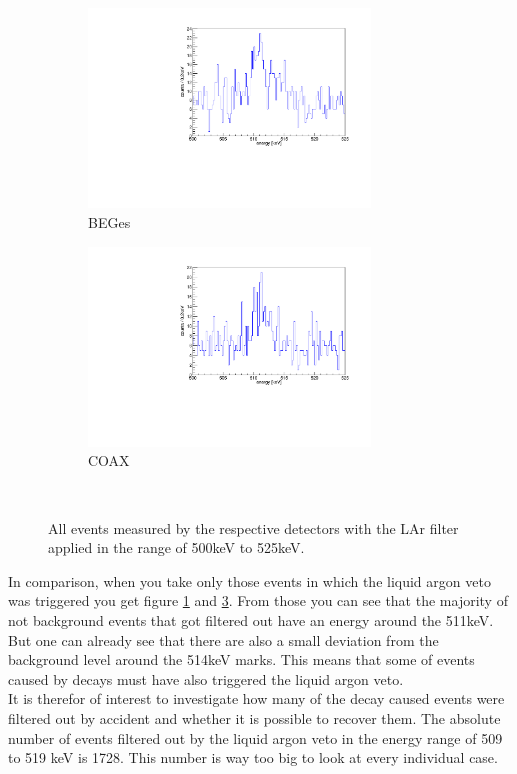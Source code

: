 \begin{figure}[t!]
	\centering
	\begin{subfigure}{.5\textwidth}
		\includegraphics[width=75mm]{./Bilder/AntiLArBEGe.pdf}
		\caption{BEGes}
		\label{fig:AntiLArBEGes}
	\end{subfigure}%
	\begin{subfigure}{.5\textwidth}
		\includegraphics[width=75mm]{./Bilder/AntiLArCOAX.pdf}
		\caption{COAX}
		\label{fig:AntiLArCOAX}
	\end{subfigure}
	\\
	\vspace{0.5cm}
	\caption{All events measured by the respective detectors with the LAr filter applied in the range of 500keV to 525keV.}
\end{figure}

In comparison, when you take only those events in which the liquid argon veto was triggered you get figure \ref{fig:AntiLArBEGes} and \ref{fig:AntiLArCOAX}.
From those you can see that the majority of not background events that got filtered out have an energy around the 511keV.
But one can already see that there are also a small deviation from the background level around the 514keV marks.
This means that some of events caused by \Kr decays must have also triggered the liquid argon veto.
\\

It is therefor of interest to investigate how many of the \Kr decay caused events were filtered out by accident and whether it is possible to recover them.
The absolute number of events filtered out by the liquid argon veto in the energy range of 509 to 519 keV is 1728.
This number is way too big to look at every individual case.
\\

